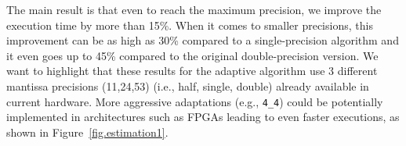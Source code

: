 The main result is that even to reach the maximum precision, we improve the
execution time by more than 15\%. When it comes to smaller precisions, this
improvement can be as high as 30\% compared to a single-precision algorithm and
it even goes up to 45\% compared to the original double-precision version. We
want to highlight that these results for the adaptive algorithm use 3 different
mantissa precisions (11,24,53) (i.e., half, single, double) already available
in current hardware. More aggressive adaptations (e.g., \texttt{4\_4}) could be
potentially implemented in architectures such as FPGAs leading to even faster
executions, as shown in Figure~\ref{fig.estimation1}.


